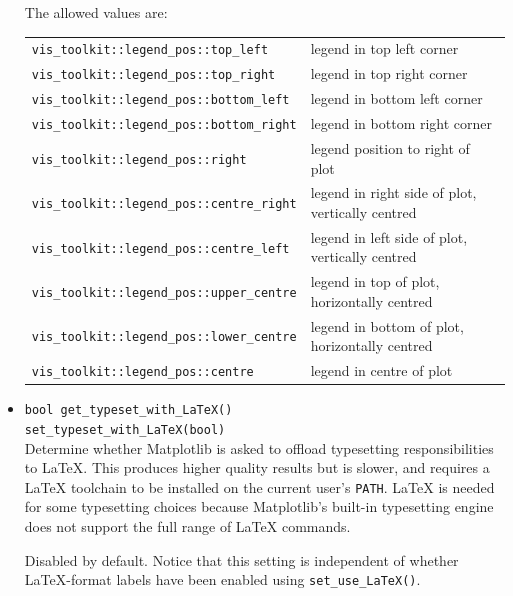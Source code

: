 \documentclass[11pt,a4paper]{article}
\newcommand{\packagefont}{\sffamily}
\newcommand{\Matplotlib}{{\packagefont Matplotlib}}
\begin{document}
\begin{itemize}
    The allowed values are: \\
    \begin{tabular}{p{6.5cm}p{7cm}}
        \texttt{vis_toolkit::legend_pos::top_left} & legend in top left corner \\
        \texttt{vis_toolkit::legend_pos::top_right} & legend in top right corner \\
        \texttt{vis_toolkit::legend_pos::bottom_left} & legend in bottom left corner \\
        \texttt{vis_toolkit::legend_pos::bottom_right} & legend in bottom right corner \\
        \texttt{vis_toolkit::legend_pos::right} & legend position to right of plot \\
        \texttt{vis_toolkit::legend_pos::centre_right} & legend in right side of plot, vertically centred  \\
        \texttt{vis_toolkit::legend_pos::centre_left} & legend in left side of plot, vertically centred \\
        \texttt{vis_toolkit::legend_pos::upper_centre} & legend in top of plot, horizontally centred \\
        \texttt{vis_toolkit::legend_pos::lower_centre} & legend in bottom of plot, horizontally centred \\
        \texttt{vis_toolkit::legend_pos::centre} & legend in centre of plot \\
    \end{tabular}
    
    \item \texttt{bool get_typeset_with_LaTeX()} \\
    \texttt{set_typeset_with_LaTeX(bool)} \\
    Determine whether {\Matplotlib} is
	asked to offload typesetting responsibilities
	to {\LaTeX}. This produces higher quality results but is slower, and requires
	a {\LaTeX} toolchain to be installed on
	the current user's
	\texttt{PATH}.	
	{\LaTeX} is needed for some typesetting choices because {\Matplotlib}'s
	built-in typesetting engine does not support the full range of
	{\LaTeX} commands.
	
	Disabled by default. Notice that this setting is independent of
	whether {\LaTeX}-format labels have been enabled using
	\texttt{set_use_LaTeX()}.
	

\end{itemize}
\end{document}
